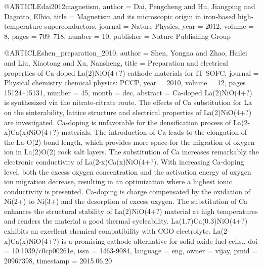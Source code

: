 @ARTICLE{dai2012magnetism,
  author = {Dai, Pengcheng and Hu, Jiangping and Dagotto, Elbio},
  title = {Magnetism and its microscopic origin in iron-based high-temperature
	superconductors},
  journal = {Nature Physics},
  year = {2012},
  volume = {8},
  pages = {709--718},
  number = {10},
  publisher = {Nature Publishing Group}
}

@ARTICLE{shen_preparation_2010,
  author = {Shen, Yongna and Zhao, Hailei and Liu, Xiaotong and Xu, Nansheng},
  title = {Preparation and electrical properties of {Ca}-doped {La}(2){NiO}(4+?)
	cathode materials for {IT}-{SOFC}},
  journal = {Physical chemistry chemical physics: PCCP},
  year = {2010},
  volume = {12},
  pages = {15124--15131},
  number = {45},
  month = dec,
  abstract = {Ca-doped La(2)NiO(4+?) is synthesized via the nitrate-citrate route.
	The effects of Ca substitution for La on the sinterability, lattice
	structure and electrical properties of La(2)NiO(4+?) are investigated.
	Ca-doping is unfavorable for the densification process of La(2-x)Ca(x)NiO(4+?)
	materials. The introduction of Ca leads to the elongation of the
	La-O(2) bond length, which provides more space for the migration
	of oxygen ion in La(2)O(2) rock salt layers. The substitution of
	Ca increases remarkably the electronic conductivity of La(2-x)Ca(x)NiO(4+?).
	With increasing Ca-doping level, both the excess oxygen concentration
	and the activation energy of oxygen ion migration decrease, resulting
	in an optimization where a highest ionic conductivity is presented.
	Ca-doping is charge compensated by the oxidation of Ni(2+) to Ni(3+)
	and the desorption of excess oxygen. The substitution of Ca enhances
	the structural stability of La(2)NiO(4+?) material at high temperatures
	and renders the material a good thermal cycleability. La(1.7)Ca(0.3)NiO(4+?)
	exhibits an excellent chemical compatibility with CGO electrolyte.
	La(2-x)Ca(x)NiO(4+?) is a promising cathode alternative for solid
	oxide fuel cells.},
  doi = {10.1039/c0cp00261e},
  issn = {1463-9084},
  language = {eng},
  owner = {vijay},
  pmid = {20967398},
  timestamp = {2015.06.20}
}

